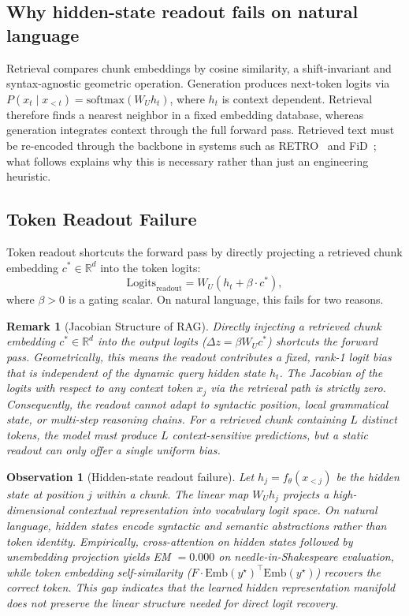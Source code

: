 \documentclass[preprint,12pt]{elsarticle}
\newtheorem{remark}[theorem]{Remark}
\newtheorem{observation}[theorem]{Observation}
\newcommand{\softmax}{\mathrm{softmax}}
\begin{document}
\subsection{Why hidden-state readout fails on natural language}

Retrieval compares chunk embeddings by cosine similarity, a shift-invariant and syntax-agnostic geometric operation. Generation produces next-token logits via $P(x_t\mid x_{<t})=\softmax(W_U h_t)$, where $h_t$ is context dependent. Retrieval therefore finds a nearest neighbor in a fixed embedding database, whereas generation integrates context through the full forward pass. Retrieved text must be re-encoded through the backbone in systems such as RETRO~\cite{retro} and FiD~\cite{fid}; what follows explains why this is necessary rather than just an engineering heuristic.

\subsection{Token Readout Failure}

Token readout shortcuts the forward pass by directly projecting a retrieved chunk embedding $c^* \in \mathbb{R}^d$ into the token logits:
\begin{equation}
\text{Logits}_{\text{readout}} = W_U (h_t + \beta \cdot c^*),
\end{equation}
where $\beta > 0$ is a gating scalar. On natural language, this fails for two reasons.

\begin{remark}[Jacobian Structure of RAG]
\label{thm:context-indep}
Directly injecting a retrieved chunk embedding $c^* \in \mathbb{R}^d$ into the output logits ($\Delta z = \beta W_U c^*$) shortcuts the forward pass. Geometrically, this means the readout contributes a fixed, rank-1 logit bias that is independent of the dynamic query hidden state $h_t$. The Jacobian of the logits with respect to any context token $x_j$ via the retrieval path is strictly zero. Consequently, the readout cannot adapt to syntactic position, local grammatical state, or multi-step reasoning chains. For a retrieved chunk containing $L$ distinct tokens, the model must produce $L$ context-sensitive predictions, but a static readout can only offer a single uniform bias.
\end{remark}

\begin{observation}[Hidden-state readout failure]
\label{prop:hidden-readout}
Let $h_j = f_\theta(x_{<j})$ be the hidden state at position $j$ within a chunk. The linear map $W_U h_j$ projects a high-dimensional contextual representation into vocabulary logit space. On natural language, hidden states encode syntactic and semantic abstractions rather than token identity. Empirically, cross-attention on hidden states followed by unembedding projection yields EM $= 0.000$ on needle-in-Shakespeare evaluation, while token embedding self-similarity ($F \cdot \text{Emb}(y^\star)^\top \text{Emb}(y^\star)$) recovers the correct token. This gap indicates that the learned hidden representation manifold does not preserve the linear structure needed for direct logit recovery.
\end{observation}
\end{document}
